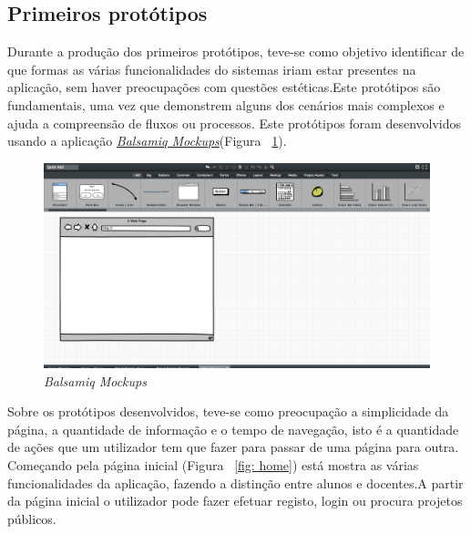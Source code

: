  \subsection{Primeiros protótipos}

Durante a produção dos primeiros protótipos, teve-se como objetivo identificar de que formas as várias funcionalidades do sistemas iriam estar presentes na aplicação, sem haver preocupações com questões estéticas.Este protótipos são fundamentais, uma vez que demonstrem alguns dos cenários mais complexos e ajuda a compreensão de fluxos ou processos.
Este protótipos foram desenvolvidos usando a aplicação \href{http://balsamiq.com/products/mockups/}{\emph{Balsamiq Mockups}}(Figura ~\ref{fig: balsamiq}).\\

 \begin{figure}[H]
        \centering
        \includegraphics[width=1\textwidth]{images/prototipos/mockups/balsamiq.png}
         \caption{\emph{Balsamiq Mockups}}
         \label{fig: balsamiq}
\end{figure}

Sobre os protótipos desenvolvidos, teve-se como preocupação a simplicidade da página, a quantidade de informação e o tempo de navegação, isto é a quantidade de ações que um utilizador tem que fazer para passar de uma página para outra.\\
Começando pela página inicial (Figura ~\ref{fig: home}) está mostra as várias funcionalidades da aplicação, fazendo a distinção entre alunos e docentes.A partir da página inicial o utilizador pode fazer efetuar registo, login ou procura projetos públicos. \\


